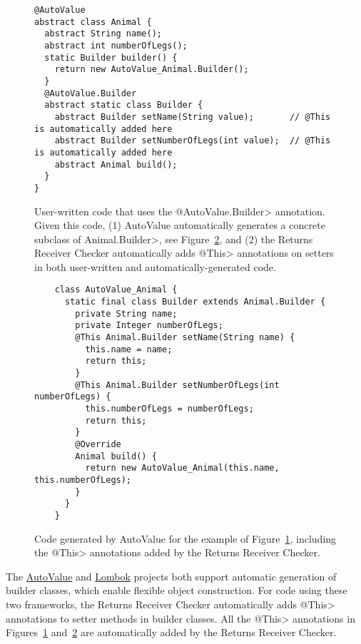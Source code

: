 
\begin{figure}
\begin{Verbatim}
@AutoValue
abstract class Animal {
  abstract String name();
  abstract int numberOfLegs();
  static Builder builder() {
    return new AutoValue_Animal.Builder();
  }
  @AutoValue.Builder
  abstract static class Builder {
    abstract Builder setName(String value);       // @This is automatically added here
    abstract Builder setNumberOfLegs(int value);  // @This is automatically added here
    abstract Animal build();
  }
}
\end{Verbatim}
    \caption{User-written code that uses the \<@AutoValue.Builder> annotation.
      Given this code,
      (1) AutoValue automatically generates a concrete subclass of
      \<Animal.Builder>, see Figure~\ref{fig-autovalue-builder-generated}, and
      (2) the Returns Receiver Checker automatically adds \<@This> annotations
      on setters in both user-written and automatically-generated code.}
    \label{fig-autovalue-builder}
\end{figure}

\begin{figure}
    \begin{Verbatim}
    class AutoValue_Animal {
      static final class Builder extends Animal.Builder {
        private String name;
        private Integer numberOfLegs;
        @This Animal.Builder setName(String name) {
          this.name = name;
          return this;
        }
        @This Animal.Builder setNumberOfLegs(int numberOfLegs) {
          this.numberOfLegs = numberOfLegs;
          return this;
        }
        @Override
        Animal build() {
          return new AutoValue_Animal(this.name, this.numberOfLegs);
        }
      }
    }
    \end{Verbatim}
    \caption{Code generated by AutoValue for the example of
    Figure~\ref{fig-autovalue-builder}, including the \<@This> annotations added
    by the Returns Receiver Checker.}
    \label{fig-autovalue-builder-generated}
\end{figure}

The \href{https://github.com/google/auto/tree/master/value}{AutoValue} and
\href{https://projectlombok.org/}{Lombok} projects both support automatic
generation of builder classes, which enable flexible object construction.
For code using these two frameworks, the Returns Receiver Checker
automatically adds \<@This> annotations to setter methods in builder
classes.  All the \<@This> annotations in
Figures~\ref{fig-autovalue-builder}
and~\ref{fig-autovalue-builder-generated} are automatically added by the
Returns Receiver Checker.

